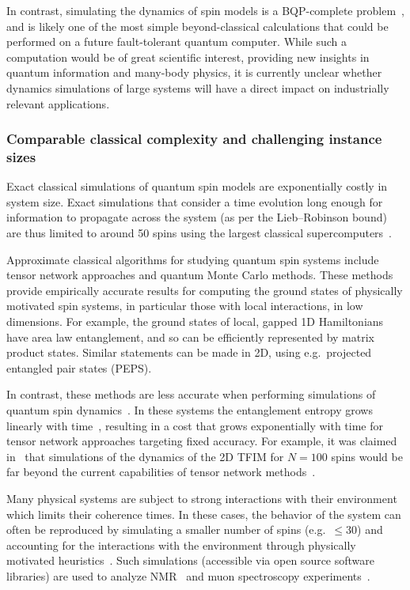 \begin{refsection}
In contrast, simulating the dynamics of spin models is a BQP-complete problem~\cite{lloyd1996UnivQSim}, and is likely one of the most simple beyond-classical calculations that could be performed on a future fault-tolerant quantum computer. While such a computation would be of great scientific interest, providing new insights in quantum information and many-body physics, it is currently unclear whether dynamics simulations of large systems will have a direct impact on industrially relevant applications.




\subsubsection*{Comparable classical complexity and challenging instance sizes}

Exact classical simulations of quantum spin models are exponentially costly in system size. Exact simulations that consider a time evolution long enough for information to propagate across the system (as per the Lieb--Robinson bound) are thus limited to around 50 spins using the largest classical supercomputers~\cite{haner2017petabyte45qubit,childs2018towardsFirstQSimSpeedup}.

Approximate classical algorithms for studying quantum spin systems include tensor network approaches and quantum Monte Carlo methods. These methods provide empirically accurate results for computing the ground states of physically motivated spin systems, in particular those with local interactions, in low dimensions. For example, the ground states of local, gapped 1D Hamiltonians have area law entanglement, and so can be efficiently represented by matrix product states. Similar statements can be made in 2D, using e.g.~projected entangled pair states (PEPS). 

In contrast, these methods are less accurate when performing simulations of quantum spin dynamics~\cite{schuch2008entropyScaling,schollwock2011dMRG}. In these systems the entanglement entropy grows linearly with time~\cite{calabrese2005entanglementEntropy1D}, resulting in a cost that grows exponentially with time for tensor network approaches targeting fixed accuracy. For example, it was claimed in~\cite{flannigan2022} that simulations of the dynamics of the 2D TFIM for $N=100$ spins would be far beyond the current capabilities of tensor network methods~\cite{flannigan2022}. 

Many physical systems are subject to strong interactions with their environment which limits their coherence times. In these cases, the behavior of the system can often be reproduced by simulating a smaller number of spins (e.g.~$\leq 30$) and accounting for the interactions with the environment through physically motivated heuristics~\cite{wilkinson2020MuonFluorine}. Such simulations (accessible via open source software libraries) are used to analyze NMR~\cite{hogben2011NMRSpinach} and muon spectroscopy experiments~\cite{bonfa2021MuonSim}.





\end{refsection}
